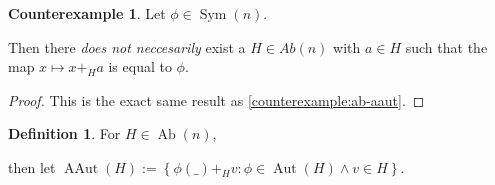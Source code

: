 \documentclass[a4paper, 12pt, english]{article}
\theoremstyle{plain}
\theoremstyle{definition}
\newtheorem{definition}[theorem]{Definition}
\newtheorem{counterexample}[theorem]{Counterexample}
\newcommand{\set}[1]{ \left\{ #1 \right\} } %
\DeclareMathOperator{\Ab}{Ab}
\DeclareMathOperator{\Aut}{Aut}
\DeclareMathOperator{\AAut}{AAut}
\DeclareMathOperator{\Sym}{Sym}
\begin{document}
\begin{counterexample}
    Let \( \phi \in \Sym(n) \).

    Then there \emph{does not neccesarily} exist a \( H \in Ab(n) \) with \( a \in H \) such that the map  \( x \mapsto  x +_H a \) is equal to \( \phi \).
\end{counterexample}
\begin{proof}
    This is the exact same result as \autoref{counterexample:ab-aaut}.
\end{proof}

\begin{definition} \label{def:abelian-aaut}
    For \( H \in \Ab(n) \),

    then let \( \AAut(H) := \set{\phi(\_) +_H v : \phi \in \Aut(H) \land v \in H} \).
\end{definition}
\end{document}
